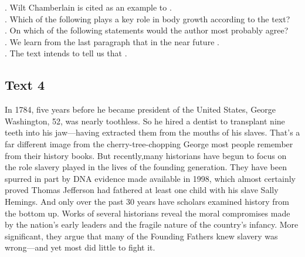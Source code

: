 \begin{questions} . Wilt Chamberlain is cited as an example to .
\\ . Which of the following plays a key role in body growth according to the text?
\\ . On which of the following statements would the author most probably agree?
\\ . We learn from the last paragraph that in the near future .
\\ . The text intends to tell us that .
\\ \end{questions}      \subsection{Text 4}
In 1784, five years before he became president of the United States, George Washington, 52, was nearly toothless. So he hired a dentist to transplant nine teeth into his jaw—having extracted them from the mouths of his slaves.
That’s a far different image from the cherry-tree-chopping George most people remember from their history books. But recently,many historians have begun to focus on the role slavery played in the lives of the founding generation. They have been spurred in part by DNA evidence made available in 1998, which almost certainly proved Thomas Jefferson had fathered at least one child with his slave Sally Hemings. And only over the past 30 years have scholars examined history from the bottom up. Works of several historians reveal the moral compromises made by the nation’s early leaders and the fragile nature of the country’s infancy. More significant, they argue that many of the Founding Fathers knew slavery was wrong—and yet most did little to fight it.
